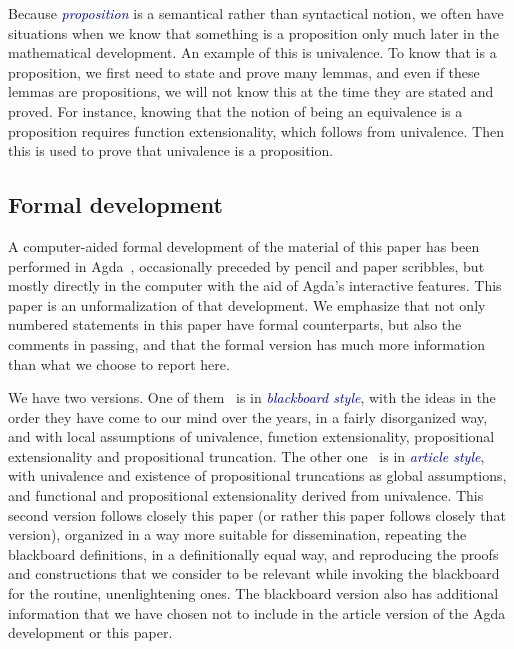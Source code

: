 \documentclass[10pt]{article}
\newcommand{\db}{\textcolor{darkblue}}
\newcommand{\df}[1]{\emph{\db{#1}}}
\theoremstyle{definition}
\begin{document}
\begin{enumerate}
  Because \df{proposition} is a semantical rather than syntactical
  notion, we often have situations when we know that something is a
  proposition only much later in the mathematical development. An
  example of this is univalence. To know that is a proposition, we
  first need to state and prove many lemmas, and even if these lemmas
  are propositions, we will not know this at the time they are stated
  and proved. For instance, knowing that the notion of being an
  equivalence is a proposition requires function extensionality, which
  follows from univalence. Then this is used to prove that univalence
  is a proposition.

\end{enumerate}

\subsection{Formal development}

A computer-aided formal development of the material of this paper has
been performed in Agda~\cite{agda}, occasionally preceded by pencil
and paper scribbles, but mostly directly in the computer with the aid
of Agda's interactive features. This paper is an unformalization of
that development. We emphasize that not only numbered statements in
this paper have formal counterparts, but also the comments in passing,
and that the formal version has much more information than what we
choose to report here.

We have two versions. One of them~\cite{injective:blackboard} is in
\df{blackboard style}, with the ideas in the order they have come to
our mind over the years, in a fairly disorganized way, and with local
assumptions of univalence, function extensionality, propositional
extensionality and propositional truncation. The other
one~\cite{injective:article} is in \df{article style}, with univalence
and existence of propositional truncations as global assumptions, and
functional and propositional extensionality derived from
univalence. This second version follows closely this paper (or rather
this paper follows closely that version), organized in a way more
suitable for dissemination, repeating the blackboard definitions, in a
definitionally equal way, and reproducing the proofs and constructions
that we consider to be relevant while invoking the blackboard for the
routine, unenlightening ones. The blackboard version also has
additional information that we have chosen not to include in the
article version of the Agda development or this paper.
\end{document}
